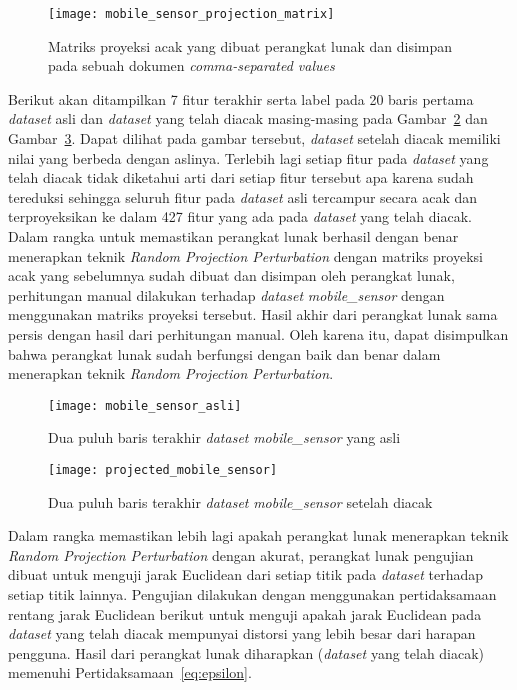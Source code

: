\begin{figure}
	\centering
	\texttt{[image: mobile\_sensor\_projection\_matrix]}
	\caption{Matriks proyeksi acak yang dibuat perangkat lunak dan disimpan pada sebuah dokumen  \textit{comma-separated values}}
	\label{fig:mobile_sensor_projection_matrix}
\end{figure}

Berikut akan ditampilkan 7 fitur terakhir serta label pada 20 baris pertama \textit{dataset} asli dan \textit{dataset} yang telah diacak masing-masing pada Gambar~\ref{fig:mobile_sensor_asli} dan Gambar~\ref{fig:projected_mobile_sensor}. Dapat dilihat pada gambar tersebut, \textit{dataset} setelah diacak memiliki nilai yang berbeda dengan aslinya. Terlebih lagi setiap fitur pada \textit{dataset} yang telah diacak tidak diketahui arti dari setiap fitur tersebut apa karena sudah tereduksi sehingga seluruh fitur pada \textit{dataset} asli tercampur secara acak dan terproyeksikan ke dalam 427 fitur yang ada pada \textit{dataset} yang telah diacak. Dalam rangka untuk memastikan perangkat lunak berhasil dengan benar menerapkan teknik \textit{Random Projection Perturbation} dengan matriks proyeksi acak yang sebelumnya sudah dibuat dan disimpan oleh perangkat lunak, perhitungan manual dilakukan terhadap \textit{dataset} \textit{mobile\_sensor} dengan menggunakan matriks proyeksi tersebut. Hasil akhir dari perangkat lunak sama persis dengan hasil dari perhitungan manual. Oleh karena itu, dapat disimpulkan bahwa perangkat lunak sudah berfungsi dengan baik dan benar dalam menerapkan teknik \textit{Random Projection Perturbation}.

\begin{figure}
	\centering
	\texttt{[image: mobile\_sensor\_asli]}
	\caption{Dua puluh baris terakhir \textit{dataset} \textit{mobile\_sensor} yang asli}
	\label{fig:mobile_sensor_asli}
\end{figure}

\begin{figure}
	\centering
	\texttt{[image: projected\_mobile\_sensor]}
	\caption{Dua puluh baris terakhir \textit{dataset} \textit{mobile\_sensor} setelah diacak}
	\label{fig:projected_mobile_sensor}
\end{figure}

Dalam rangka memastikan lebih lagi apakah perangkat lunak menerapkan teknik \textit{Random Projection Perturbation} dengan akurat, perangkat lunak pengujian dibuat untuk menguji jarak Euclidean dari setiap titik pada \textit{dataset} terhadap setiap titik lainnya. Pengujian dilakukan dengan menggunakan pertidaksamaan rentang jarak Euclidean berikut untuk menguji apakah jarak Euclidean pada \textit{dataset} yang telah diacak mempunyai distorsi yang lebih besar dari harapan pengguna. Hasil dari perangkat lunak diharapkan (\textit{dataset} yang telah diacak) memenuhi Pertidaksamaan~\ref{eq:epsilon}.

